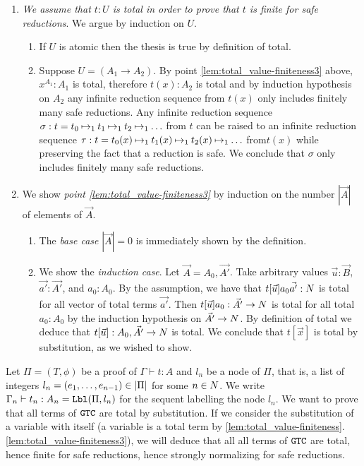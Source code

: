 \documentclass{article}
\newenvironment{proof}[1][Proof]{\begin{trivlist}
\item[\hskip \labelsep {\bfseries #1}]}{\end{trivlist}}
\begin{document}
\begin{proof}
\begin{enumerate}
\item
\emph{We assume that  $t:U$ is total in order to prove that $t$ is finite for safe reductions}.
We argue by induction on $U$.
\begin{enumerate}
\item
If $U$ is atomic then the thesis is true by definition of total.
\item
Suppose $U = (A_1 \rightarrow A_2)$. By point \ref{lem:total_value-finiteness3} above,
$x^{A_1}:A_1$ is total, therefore $t(x):A_2$ is total and by induction hypothesis on $A_2$
any infinite reduction sequence from $t(x)$ only includes finitely many safe reductions. 
Any infinite reduction sequence 
$\sigma: t = t_0 \mathbin{\mapsto}_1 t_1 \mathbin{\mapsto}_1 t_2 \mathbin{\mapsto}_1 \ldots$  from $t$ 
can be raised to an infinite reduction sequence 
$\tau: t = t_0(x) \mathbin{\mapsto}_1 t_1(x) \mathbin{\mapsto}_1 t_2(x) \mathbin{\mapsto}_1 \ldots$  from$t(x)$
while preserving the fact that a reduction is safe. 
We conclude that $\sigma$ only includes finitely many safe reductions. 
\end{enumerate}

\item  
We show \emph{point \ref{lem:total_value-finiteness3}} by induction on the number $|\vec{A}|$ of
elements of $\vec{A}$.
\begin{enumerate}
\item
  The \emph{base case} $|\vec{A}| = 0$ is immediately shown by the definition.
\item
  We show the \emph{induction case}. Let $\vec{A} = A_0,\vec{A'}$.
  Take arbitrary values $\vec{u}:\vec{B}$, $\vec{a'}:\vec{A'}$, and $a_0:A_0$. 
  By the assumption, we have that $t[\vec{u}]a_0\vec{a'}:{N}$ is total  for all 
  vector of total terms $\vec{a'}$. 
  Then $t[\vec{u}]a_0:\vec{A'}\rightarrow{N}$ is total for all total $a_0:A_0$
  by the induction hypothesis on $\vec{A'}\rightarrow {N}$.
  By definition of total we deduce that $t[\vec{u}] : A_0,\vec{A'}\rightarrow{N}$ is total.
  We conclude that $t[\vec{x}]$ is total by substitution, as we wished to show.
\end{enumerate}

\end{enumerate}
\end{proof}




Let $\Pi=(T,\phi)$ be a proof of $\Gamma\vdash t:A$ and $l_n$ be a node of $\Pi$, that is, a list  
of integers $l_n=(e_1, \ldots, e_{n-1}) \in {|\Pi|}$ for some $n \in {N}$.
We write $\Gamma_{n}\vdash t_{n}:A_{n} = {\tt Lbl}(\Pi,l_n)$ for the sequent
 labelling the node $l_n$. We want to prove that all terms of ${\tt GTC}$ are total by substitution.
If we consider the substitution of a variable with itself 
(a variable is a total term by \ref{lem:total_value-finiteness}.\ref{lem:total_value-finiteness3}),
we will deduce that all all terms of ${\tt GTC}$ are total, 
hence finite for safe reductions, hence strongly normalizing for safe reductions.
\end{document}
